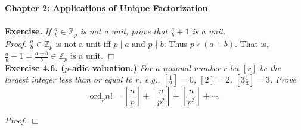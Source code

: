 \documentclass{article}
\begin{document}
\textbf{\Large Chapter 2: Applications of Unique Factorization} \\\\



\textbf{Exercise.}
\emph{If $\frac{a}{b} \in \mathbb{Z}_{p}$ is not a unit, prove that
$\frac{a}{b} + 1$ is a unit.} \\

\emph{Proof.}
$\frac{a}{b} \in \mathbb{Z}_{p}$ is not a unit iff $p \mid a$ and $p \nmid b$.
Thus $p \nmid (a +b)$. That is, $\frac{a}{b} + 1 = \frac{a + b}{b} \in \mathbb{Z}_{p}$ is a unit.
$\Box$ \\



\textbf{Exercise 4.6. ($p$-adic valuation.)}
\emph{For a rational number $r$ let $[r]$ be the largest integer less than or equal to $r$,
e.g., $[\frac{1}{2}] = 0$, $[2] = 2$, $[3 \frac{1}{3}] = 3$. Prove
$$\text{ord}_p n!
= \left[\frac{n}{p}\right] + \left[\frac{n}{p^2}\right] + \left[\frac{n}{p^3}\right] + \cdots.$$
}

\emph{Proof.}
$\Box$ \\
\end{document}
